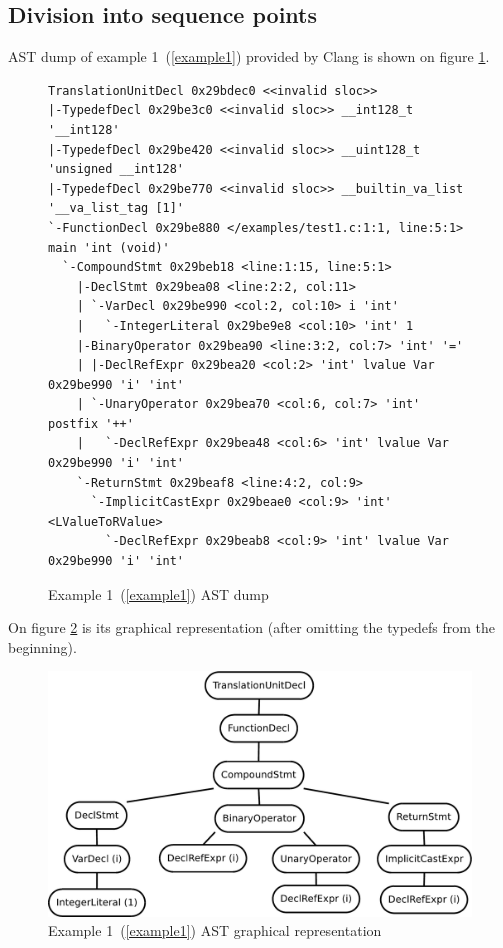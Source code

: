 \subsection{Division into sequence points}
AST dump of example 1~(\ref{example1}) provided by Clang is shown on figure \ref{ASTdump}.
\begin{figure}
\caption{Example 1~(\ref{example1}) AST dump}
\label{ASTdump}
\begin{lstlisting}
TranslationUnitDecl 0x29bdec0 <<invalid sloc>>
|-TypedefDecl 0x29be3c0 <<invalid sloc>> __int128_t '__int128'
|-TypedefDecl 0x29be420 <<invalid sloc>> __uint128_t 'unsigned __int128'
|-TypedefDecl 0x29be770 <<invalid sloc>> __builtin_va_list '__va_list_tag [1]'
`-FunctionDecl 0x29be880 </examples/test1.c:1:1, line:5:1> main 'int (void)'
  `-CompoundStmt 0x29beb18 <line:1:15, line:5:1>
    |-DeclStmt 0x29bea08 <line:2:2, col:11>
    | `-VarDecl 0x29be990 <col:2, col:10> i 'int'
    |   `-IntegerLiteral 0x29be9e8 <col:10> 'int' 1
    |-BinaryOperator 0x29bea90 <line:3:2, col:7> 'int' '='
    | |-DeclRefExpr 0x29bea20 <col:2> 'int' lvalue Var 0x29be990 'i' 'int'
    | `-UnaryOperator 0x29bea70 <col:6, col:7> 'int' postfix '++'
    |   `-DeclRefExpr 0x29bea48 <col:6> 'int' lvalue Var 0x29be990 'i' 'int'
    `-ReturnStmt 0x29beaf8 <line:4:2, col:9>
      `-ImplicitCastExpr 0x29beae0 <col:9> 'int' <LValueToRValue>
        `-DeclRefExpr 0x29beab8 <col:9> 'int' lvalue Var 0x29be990 'i' 'int'
\end{lstlisting}
\end{figure}
On figure \ref{ASTuntagged} is its graphical representation (after omitting the typedefs from the beginning).
\begin{figure}
    \caption{Example 1~(\ref{example1}) AST graphical representation}
    \label{ASTuntagged}
    \centering
        \includegraphics[width=1\textwidth]{fig/example1G.pdf}
\end{figure}


